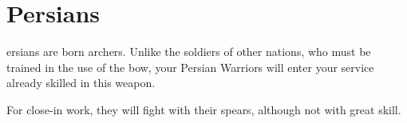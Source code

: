 
\clearpage

\section{\textsf{Persians}}


ersians are born archers. Unlike the soldiers of other nations, who must be trained in the use of the bow, your Persian Warriors will enter your service already skilled in this weapon.


For close-in work, they will fight with their spears, although not with great skill.

